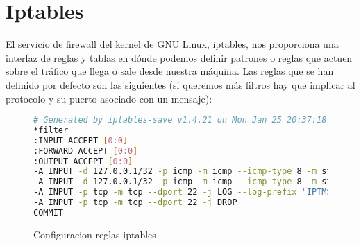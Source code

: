 \section{Iptables}

El servicio de firewall del kernel de GNU Linux, iptables, nos proporciona una interfaz de reglas y tablas en dónde podemos definir patrones o reglas que actuen sobre el tráfico que llega o sale desde nuestra máquina. Las reglas que se han definido por defecto son las siguientes (si queremos más filtros hay que implicar al protocolo y su puerto asociado con un mensaje):

\begin{figure}[H]
\begin{lstlisting}[language=bash]
# Generated by iptables-save v1.4.21 on Mon Jan 25 20:37:18 2016
*filter
:INPUT ACCEPT [0:0]
:FORWARD ACCEPT [0:0]
:OUTPUT ACCEPT [0:0]
-A INPUT -d 127.0.0.1/32 -p icmp -m icmp --icmp-type 8 -m state --state NEW,RELATED,ESTABLISHED -j LOG --log-prefix "IPTMSG=Connection ICMP "
-A INPUT -d 127.0.0.1/32 -p icmp -m icmp --icmp-type 8 -m state --state NEW,RELATED,ESTABLISHED -j DROP
-A INPUT -p tcp -m tcp --dport 22 -j LOG --log-prefix "IPTMSG=Connection SSH "
-A INPUT -p tcp -m tcp --dport 22 -j DROP
COMMIT
\end{lstlisting}
\caption{Configuracion reglas iptables}
\end{figure}

